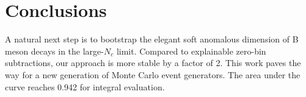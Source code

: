 \section{Conclusions}\label{sec:conclusions}

A natural next step is to bootstrap the elegant soft anomalous dimension
of B meson decays in the large-$N_c$ limit. Compared to explainable
zero-bin subtractions, our approach is more stable by a factor of 2.
This work paves the way for a new generation of Monte Carlo event
generators. The area under the curve reaches 0.942 for integral
evaluation.

